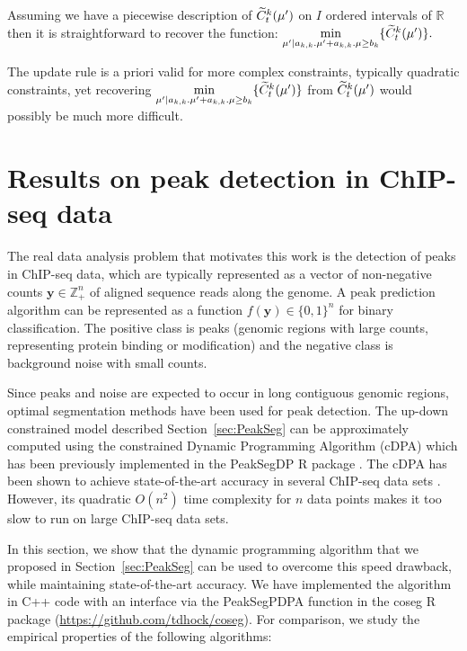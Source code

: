 \documentclass{article}
\newcommand{\ZZ}{\mathbb Z}
\begin{document}
Assuming we have a piecewise description of $\widetilde{C}^{k}_{t}(\mu')$ on $I$ ordered intervals of $\mathbb{R}$
then it is straightforward to recover the function:
$\underset{\mu' | a_{k,k}. \mu' + a_{k,k}. \mu  \geq  b_{k}}{\min} \{ \widetilde{C}^{k}_{t}(\mu') \}.$

The update rule is a priori valid for more complex constraints, typically quadratic constraints, yet recovering
$\underset{\mu' | a_{k,k}. \mu' + a_{k,k}. \mu  \geq  b_{k}}{\min} \{ \widetilde{C}^{k}_{t}(\mu') \}$ from $\widetilde{C}^{k}_{t}(\mu')$ would possibly be much more difficult.


\section{Results on peak detection in ChIP-seq data}

The real data analysis problem that motivates this work is the
detection of peaks in ChIP-seq data, which are typically represented
as a vector of non-negative counts $\mathbf y\in\ZZ_+^n$ of aligned
sequence reads along the genome. A peak prediction algorithm can be
represented as a function $f(\mathbf y)\in\{0,1\}^n$ for binary
classification. The positive class is peaks (genomic regions with
large counts, representing protein binding or modification) and the
negative class is background noise with small counts.

Since peaks and noise are expected to occur in long contiguous genomic
regions, optimal segmentation methods have been used for peak
detection. The up-down constrained model described
Section~\ref{sec:PeakSeg} can be approximately computed using the
constrained Dynamic Programming Algorithm (cDPA) which has been
previously implemented in the PeakSegDP R package
\citep{HOCKING-PeakSeg}. The cDPA has been shown to achieve
state-of-the-art accuracy in several ChIP-seq data sets
\citep{HOCKING2016-chipseq}. However, its quadratic $O(n^2)$ time
complexity for $n$ data points makes it too slow to run on large
ChIP-seq data sets.

In this section, we show that the dynamic programming algorithm that
we proposed in Section~\ref{sec:PeakSeg} can be used to overcome this
speed drawback, while maintaining state-of-the-art accuracy. We have
implemented the algorithm in C++ code with an interface via the
PeakSegPDPA function in the coseg R package
(\url{https://github.com/tdhock/coseg}). For comparison, we study the
empirical properties of the following algorithms:
\end{document}

